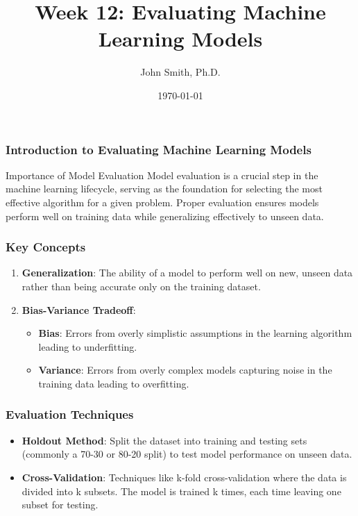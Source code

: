 \documentclass[aspectratio=169]{beamer}
\title[Evaluating Machine Learning Models]{Week 12: Evaluating Machine Learning Models}
\author[J. Smith]{John Smith, Ph.D.}
\institute[University Name]{
  Department of Computer Science\\
  University Name\\
  \vspace{0.3cm}
  Email: email@university.edu\\
  Website: www.university.edu
}
\date{\today}
\begin{document}
\frame{\titlepage}

\begin{frame}[fragile]
    \frametitle{Introduction to Evaluating Machine Learning Models}
    \begin{block}{Importance of Model Evaluation}
        Model evaluation is a crucial step in the machine learning lifecycle, serving as the foundation for selecting the most effective algorithm for a given problem. Proper evaluation ensures models perform well on training data while generalizing effectively to unseen data.
    \end{block}
\end{frame}

\begin{frame}[fragile]
    \frametitle{Key Concepts}
    \begin{enumerate}
        \item \textbf{Generalization}: The ability of a model to perform well on new, unseen data rather than being accurate only on the training dataset.
        
        \item \textbf{Bias-Variance Tradeoff}:
        \begin{itemize}
            \item \textbf{Bias}: Errors from overly simplistic assumptions in the learning algorithm leading to underfitting.
            \item \textbf{Variance}: Errors from overly complex models capturing noise in the training data leading to overfitting.
        \end{itemize}
    \end{enumerate}
\end{frame}

\begin{frame}[fragile]
    \frametitle{Evaluation Techniques}
    \begin{itemize}
        \item \textbf{Holdout Method}: Split the dataset into training and testing sets (commonly a 70-30 or 80-20 split) to test model performance on unseen data.
        
        \item \textbf{Cross-Validation}: Techniques like k-fold cross-validation where the data is divided into k subsets. The model is trained k times, each time leaving one subset for testing.
    \end{itemize}
\end{frame}
\end{document}
